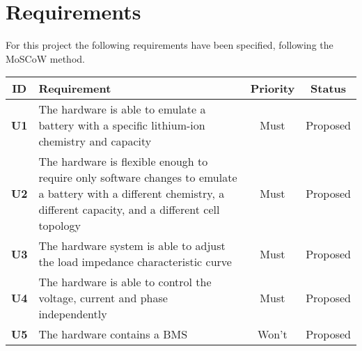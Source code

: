 \section{Requirements}
For this project the following requirements have been specified, following the MoSCoW method. 

\begin{longtable}{|c|p{10cm}|c|c|}
    \hline
    \textbf{ID} & \textbf{Requirement} & \textbf{Priority} & \textbf{Status}\\ \hline 
    \textbf{U1} & The hardware is able to emulate a battery with a specific lithium-ion chemistry and capacity & Must & Proposed\\ \hline
    \textbf{U2} & The hardware is flexible enough to require only software changes to emulate a battery with a different chemistry, a different capacity, and a different cell topology & Must & Proposed\\ \hline
    \textbf{U3} & The hardware system is able to adjust the load impedance characteristic curve & Must & Proposed\\ \hline
    \textbf{U4} & The hardware is able to control the voltage, current and phase independently & Must & Proposed\\ \hline
    \textbf{U5} & The hardware contains a BMS & Won't & Proposed\\ \hline
\end{longtable}

